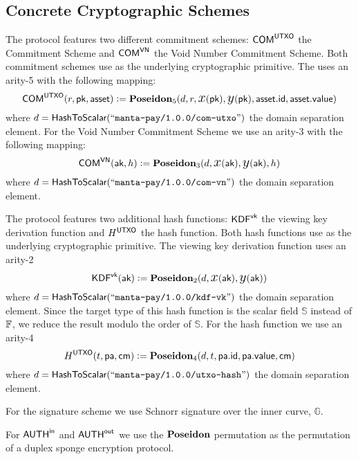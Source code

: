 \subsection{Concrete Cryptographic Schemes}

\begin{definition}
    The protocol features two different commitment schemes: ${\textsf{COM}}^{{\textsf{UTXO}}}$ the \UTXO{} Commitment Scheme and ${\textsf{COM}}^{{\textsf{VN}}}$ the Void Number Commitment Scheme. Both commitment schemes use \Poseidon{} as the underlying cryptographic primitive. The \UTXO{} uses an arity-5 \Poseidon{} with the following mapping:
    \[{\textsf{COM}}^{{\textsf{UTXO}}}(r, {\textsf{pk}}, {\textsf{asset}}) := {\textbf{Poseidon}}_5(d, r, {\text{\Large $x$}}({\textsf{pk}}), {\text{\Large $y$}}({\textsf{pk}}), {\textsf{asset}}.{\textsf{id}}, {\textsf{asset}}.{\textsf{value}})\]
    where $d = {\textsf{HashToScalar}}({``\texttt{manta-pay/1.0.0/com-utxo}"})$ the domain separation element.
    For the Void Number Commitment Scheme we use an arity-3 \Poseidon{} with the following mapping:
    \[{\textsf{COM}}^{{\textsf{VN}}}({\textsf{ak}}, h) := {\textbf{Poseidon}}_3(d, {\text{\Large $x$}}({\textsf{ak}}), {\text{\Large $y$}}({\textsf{ak}}), h)\]
    where $d = {\textsf{HashToScalar}}({``\texttt{manta-pay/1.0.0/com-vn}"})$ the domain separation element.
\end{definition}

\begin{definition}
    The protocol features two additional hash functions: ${\textsf{KDF}}^{{\textsf{vk}}}$ the viewing key derivation function and $H^{{\textsf{UTXO}}}$ the \UTXO{} hash function. Both hash functions use \Poseidon{} as the underlying cryptographic primitive. The viewing key derivation function uses an arity-2 \Poseidon{}
    \[{\textsf{KDF}}^{{\textsf{vk}}}({\textsf{ak}}) := {\textbf{Poseidon}}_2(d, {\text{\Large $x$}}({\textsf{ak}}), {\text{\Large $y$}}({\textsf{ak}}))\]
    where $d = {\textsf{HashToScalar}}({``\texttt{manta-pay/1.0.0/kdf-vk}"})$ the domain separation element. Since the target type of this hash function is the scalar field $\mathbb{S}$ instead of ${\mathbb{F}}$, we reduce the result modulo the order of $\mathbb{S}$.
    For the \UTXO{} hash function we use an arity-4 \Poseidon{}
    \[H^{{\textsf{UTXO}}}(t, {\textsf{pa}}, {\textsf{cm}}) := {\textbf{Poseidon}}_4(d, t, {\textsf{pa}}.{\textsf{id}}, {\textsf{pa}}.{\textsf{value}}, {\textsf{cm}})\]
    where $d = {\textsf{HashToScalar}}({``\texttt{manta-pay/1.0.0/utxo-hash}"})$ the domain separation element.
\end{definition}

\begin{definition}
    For the signature scheme we use Schnorr signature over the inner curve, $\mathbb{G}$.
\end{definition}

\begin{definition}
    For ${{\textsf{AUTH}}^\textsf{in}}$ and ${{\textsf{AUTH}}^\textsf{out}}$ we use the ${\textbf{Poseidon}}$ permutation as the permutation of a duplex sponge encryption protocol.
\end{definition}

